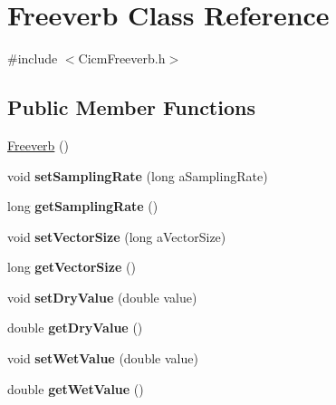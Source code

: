 \hypertarget{class_freeverb}{\section{Freeverb Class Reference}
\label{class_freeverb}
}


{\ttfamily \#include $<$Cicm\-Freeverb.\-h$>$}

\subsection*{Public Member Functions}
\begin{DoxyCompactItemize}
\item 
\hyperlink{class_freeverb_a8b16ed47ed72ea70b91564e6a63ad69f}{Freeverb} ()
\item 
\hypertarget{class_freeverb_a1a0d4cda386bd5d777e61edb48d5c718}{void {\bfseries set\-Sampling\-Rate} (long a\-Sampling\-Rate)}\label{class_freeverb_a1a0d4cda386bd5d777e61edb48d5c718}

\item 
\hypertarget{class_freeverb_a411641c9bb8c74e6e98004641f425d33}{long {\bfseries get\-Sampling\-Rate} ()}\label{class_freeverb_a411641c9bb8c74e6e98004641f425d33}

\item 
\hypertarget{class_freeverb_ab72ad6680ff9d4e38e6ac8c3c763d473}{void {\bfseries set\-Vector\-Size} (long a\-Vector\-Size)}\label{class_freeverb_ab72ad6680ff9d4e38e6ac8c3c763d473}

\item 
\hypertarget{class_freeverb_a9ff96bfb953b78c07b1049abe59b5484}{long {\bfseries get\-Vector\-Size} ()}\label{class_freeverb_a9ff96bfb953b78c07b1049abe59b5484}

\item 
\hypertarget{class_freeverb_a588242a98eba22df2881f32ed0e795c9}{void {\bfseries set\-Dry\-Value} (double value)}\label{class_freeverb_a588242a98eba22df2881f32ed0e795c9}

\item 
\hypertarget{class_freeverb_ae70d43bc6d0a23f6f7af7988180a0530}{double {\bfseries get\-Dry\-Value} ()}\label{class_freeverb_ae70d43bc6d0a23f6f7af7988180a0530}

\item 
\hypertarget{class_freeverb_a5d28dee76d8ae59d20f9f6ccb9f9757f}{void {\bfseries set\-Wet\-Value} (double value)}\label{class_freeverb_a5d28dee76d8ae59d20f9f6ccb9f9757f}

\item 
\hypertarget{class_freeverb_a82d92ff1d183dc6f631f977ccbb77362}{double {\bfseries get\-Wet\-Value} ()}\label{class_freeverb_a82d92ff1d183dc6f631f977ccbb77362}


\end{DoxyCompactItemize}
